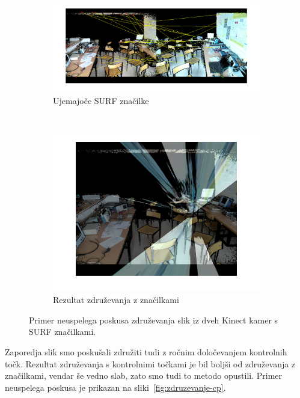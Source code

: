 \begin{figure}[!htb]
	\centering
	\begin{subfigure}[t]{0.45\columnwidth}
		\includegraphics[width=\columnwidth]{./Slike/matched-features.png}
		\caption{Ujemajoče SURF značilke}
		\label{fig:zdruzevanje-surf}
	\end{subfigure}
	~
	\begin{subfigure}[t]{0.45\columnwidth}
		\includegraphics[width=\columnwidth]{./Slike/features-calibration-result.png}
		\caption{Rezultat združevanja z značilkami}
		\label{fig:zdruzevanje-result}
	\end{subfigure}
	\caption[Neuspelo združevanje slik s SURF značilkami]{Primer neuspelega poskusa združevanja slik iz dveh Kinect kamer s SURF značilkami.}
	\label{fig:zdruzevanje-znacilke}
\end{figure}

Zaporedja slik smo poskušali združiti tudi z ročnim določevanjem kontrolnih točk. Rezultat {združevanja s kontrolnimi točkami} je bil boljši od združevanja z značilkami, vendar še vedno slab, zato smo tudi to metodo opustili. Primer neuspelega poskusa je prikazan na sliki~\ref{fig:zdruzevanje-cp}.

